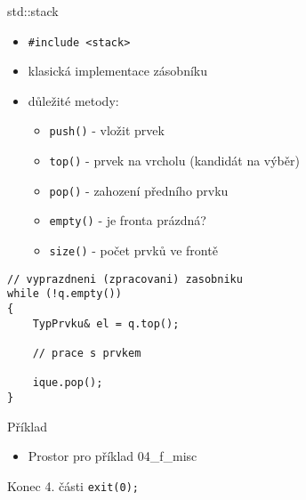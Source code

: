 \documentclass{beamer}
\begin{document}
\begin{xframe}{std::stack}
	\begin{itemize}
		\item \texttt{\#include <stack>}
		\item klasická implementace zásobníku
		\item důležité metody:
			\begin{itemize}
				\item \texttt{push()} - vložit prvek
				\item \texttt{top()} - prvek na vrcholu (kandidát na výběr)
				\item \texttt{pop()} - zahození předního prvku
				\item \texttt{empty()} - je fronta prázdná?
				\item \texttt{size()} - počet prvků ve frontě
			\end{itemize}
	\end{itemize}			
\begin{lstlisting}[basicstyle=\fontsize{8}{9}\selectfont\ttfamily]
// vyprazdneni (zpracovani) zasobniku
while (!q.empty())
{
    TypPrvku& el = q.top();

    // prace s prvkem
    
    ique.pop();
}
\end{lstlisting}
\end{xframe}

\begin{xframe}{Příklad}
	\begin{itemize}
		\item Prostor pro příklad 04\_f\_misc
	\end{itemize}
\end{xframe}








\begin{xframe}{Konec 4. části}
\texttt{exit(0);}
\end{xframe}
\end{document}
